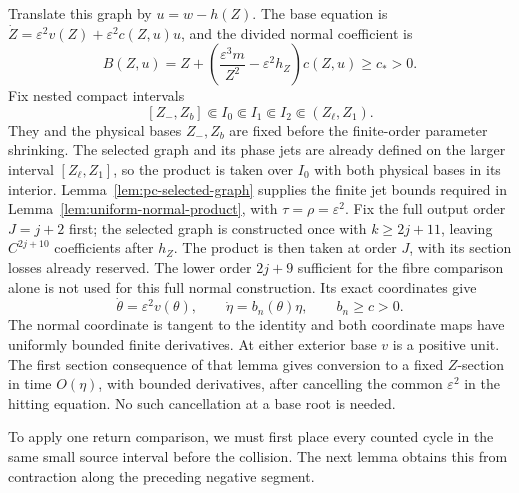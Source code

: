 Translate this graph by $u=w-h(Z)$. The base equation is
$\dot Z=\varepsilon^2v(Z)+\varepsilon^2c(Z,u)u$, and the divided
normal coefficient is
\[
 B(Z,u)=Z+\left(\frac{\varepsilon^3m}{Z^2}
                    -\varepsilon^2h_Z\right)c(Z,u)\ge c_*>0.
\]
Fix nested compact intervals
\[
 [Z_-,Z_b]\Subset I_0\Subset I_1\Subset I_2\Subset(Z_\ell,Z_1).
\]
They and the physical bases $Z_-,Z_b$ are fixed before the finite-order
parameter shrinking. The selected graph and its phase jets are already
defined on the larger interval $[Z_\ell,Z_1]$, so the product is taken
over $I_0$ with both physical bases in its interior.
Lemma~\ref{lem:pc-selected-graph} supplies the finite jet bounds
required in Lemma~\ref{lem:uniform-normal-product}, with
$\tau=\rho=\varepsilon^2$. Fix the full output order $J=j+2$ first;
the selected graph is constructed once with $k\ge2j+11$, leaving
$C^{2j+10}$ coefficients after $h_Z$. The product is then taken
at order $J$, with its section losses already reserved. The lower
order $2j+9$ sufficient for the fibre comparison alone is not used
for this full normal construction. Its exact coordinates give
\begin{equation}
\label{eq:pc-collision-product}
 \dot\theta=\varepsilon^2v(\theta),\qquad
 \dot\eta=b_n(\theta)\eta,\qquad b_n\ge c>0.
\end{equation}
The normal coordinate is tangent to the identity and both coordinate
maps have uniformly bounded finite derivatives. At either exterior
base $v$ is a positive unit. The first section consequence of that
lemma gives conversion to a fixed $Z$-section in time $O(\eta)$,
with bounded derivatives, after cancelling the common
$\varepsilon^2$ in the hitting equation. No such cancellation at a
base root is needed.

To apply one return comparison, we must first place every counted cycle
in the same small source interval before the collision. The next lemma
obtains this from contraction along the preceding negative segment.


